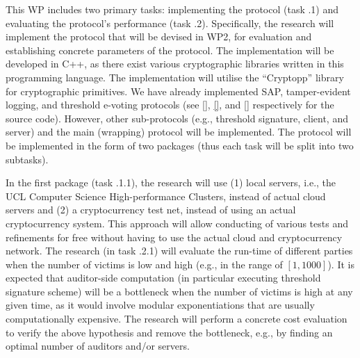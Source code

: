  
 
 \vs
\noindent{}

\vs

This WP includes two primary tasks: implementing the protocol (task \3.1) and evaluating the protocol's performance (task \3.2). 
%
Specifically, the research will implement the protocol that will be devised in WP2, for evaluation and establishing concrete parameters of the protocol. The implementation will be developed in C++, as there exist various cryptographic libraries written in this programming language. The implementation will utilise the ``Cryptopp'' library for cryptographic primitives. 
%
We have already implemented SAP, tamper-evident logging, and threshold e-voting protocols (see \href{https://github.com/AydinAbadi/RC-S-P/blob/main/RC-PoR-P-Source-cod/RC-PoR-P-Smart-Contract.sol}{[\printcntr]}, \href{https://github.com/AydinAbadi/RC-S-P/blob/main/RC-PoR-P-Source-cod/RC-PoR-P.cpp}{[\printcntr]}, and \href{https://github.com/AydinAbadi/PwDR/blob/main/PwDR-code/generic-encoding-decoding.cpp}{[\printcntr]} respectively for the source code). However, other sub-protocols (e.g., threshold signature, client, and server) and the main (wrapping) protocol will be implemented. The protocol will be implemented in the form of two packages (thus each task will be split into two subtasks). 

In the first package (task \3.1.1), the research will use (1) local servers, i.e., the UCL Computer Science High-performance Clusters, instead of actual cloud servers and (2) a cryptocurrency test net, instead of using an actual cryptocurrency system. This approach will allow conducting of various tests and refinements for free without having to use the actual cloud and cryptocurrency network. The research (in task \3.2.1) will evaluate the run-time of different parties when the number of victims is low and high (e.g., in the range of $[1,1000]$). It is expected that auditor-side computation (in particular executing threshold signature scheme) will be a bottleneck when the number of victims is high at any given time, as it would involve modular exponentiations that are usually computationally expensive. The research will perform a concrete cost evaluation to verify the above hypothesis and remove the bottleneck, e.g., by finding an optimal number of auditors and/or servers. %



